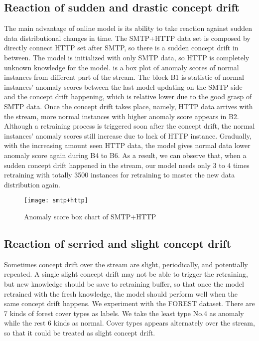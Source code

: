 \subsection{Reaction of sudden and drastic concept drift}
\label{sec:reaction}
The main advantage of online model is its ability to take reaction against sudden data distributional changes in time. The SMTP+HTTP data set is composed by directly connect HTTP set after SMTP, so there is a sudden concept drift in between. The model is initialized with only SMTP data, so HTTP is completely unknown knowledge for the model.  is a box plot of anomaly scores of normal instances from different part of the stream. The block B1 is  statistic of normal instances’ anomaly scores between the last model updating on the SMTP side and the concept drift happening, which is relative lower due to the good grasp of SMTP data. Once the concept drift takes place, namely, HTTP data arrives with the stream, more normal instances with higher anomaly score appears in B2. Although a retraining process is triggered soon after the concept drift, the normal instances’ anomaly scores still increase due to lack of HTTP instance. Gradually, with the increasing amount seen HTTP data, the model gives normal data lower anomaly score again during B4 to B6. As a result, we can observe that, when a sudden concept drift happened in the stream, our model needs only 3 to 4 times retraining with totally 3500 instances for retraining to master the new data distribution again.

\begin{figure}[h]
\centering
\texttt{[image: smtp+http]}
\caption[Anomaly score box chart of SMTP+HTTP]{Anomaly score box chart of SMTP+HTTP}
\label{fig:smtp+http}
\end{figure}

\subsection{Reaction of serried and slight concept drift}
\label{sec:reaction}

Sometimes concept drift over the stream are slight, periodically, and potentially repeated. A single slight concept drift may not be able to trigger the retraining, but new knowledge should be save to retraining buffer, so that once the model retrained with the fresh knowledge, the model should perform well when the same concept drift happens. We experiment with the FOREST dataset. There are 7 kinds of forest cover types as labels. We take the least type No.4 as anomaly while the rest 6 kinds as normal. Cover types appears alternately over the stream, so that it could be treated as slight concept drift.\\

